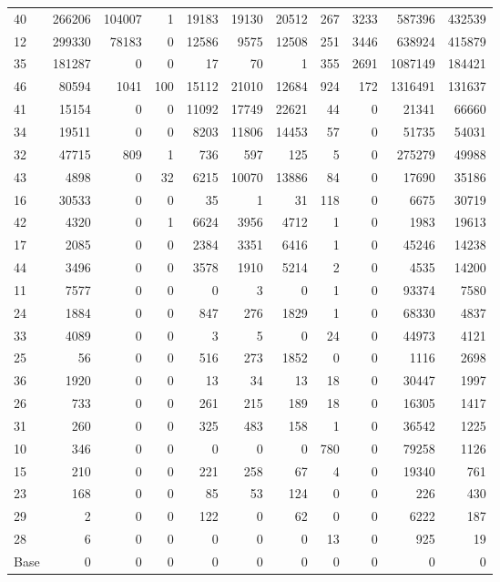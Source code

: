 \begin{table}
{\begin{tabular}[t]{lrrrrrrrrrr}
40 & 266206 & 104007 & 1 & 19183 & 19130 & 20512 & 267 & 3233 & 587396 & 432539\\
12 & 299330 & 78183 & 0 & 12586 & 9575 & 12508 & 251 & 3446 & 638924 & 415879\\
35 & 181287 & 0 & 0 & 17 & 70 & 1 & 355 & 2691 & 1087149 & 184421\\
46 & 80594 & 1041 & 100 & 15112 & 21010 & 12684 & 924 & 172 & 1316491 & 131637\\
41 & 15154 & 0 & 0 & 11092 & 17749 & 22621 & 44 & 0 & 21341 & 66660\\
34 & 19511 & 0 & 0 & 8203 & 11806 & 14453 & 57 & 0 & 51735 & 54031\\
32 & 47715 & 809 & 1 & 736 & 597 & 125 & 5 & 0 & 275279 & 49988\\
43 & 4898 & 0 & 32 & 6215 & 10070 & 13886 & 84 & 0 & 17690 & 35186\\
16 & 30533 & 0 & 0 & 35 & 1 & 31 & 118 & 0 & 6675 & 30719\\
42 & 4320 & 0 & 1 & 6624 & 3956 & 4712 & 1 & 0 & 1983 & 19613\\
17 & 2085 & 0 & 0 & 2384 & 3351 & 6416 & 1 & 0 & 45246 & 14238\\
44 & 3496 & 0 & 0 & 3578 & 1910 & 5214 & 2 & 0 & 4535 & 14200\\
11 & 7577 & 0 & 0 & 0 & 3 & 0 & 1 & 0 & 93374 & 7580\\
24 & 1884 & 0 & 0 & 847 & 276 & 1829 & 1 & 0 & 68330 & 4837\\
33 & 4089 & 0 & 0 & 3 & 5 & 0 & 24 & 0 & 44973 & 4121\\
25 & 56 & 0 & 0 & 516 & 273 & 1852 & 0 & 0 & 1116 & 2698\\
36 & 1920 & 0 & 0 & 13 & 34 & 13 & 18 & 0 & 30447 & 1997\\
26 & 733 & 0 & 0 & 261 & 215 & 189 & 18 & 0 & 16305 & 1417\\
31 & 260 & 0 & 0 & 325 & 483 & 158 & 1 & 0 & 36542 & 1225\\
10 & 346 & 0 & 0 & 0 & 0 & 0 & 780 & 0 & 79258 & 1126\\
15 & 210 & 0 & 0 & 221 & 258 & 67 & 4 & 0 & 19340 & 761\\
23 & 168 & 0 & 0 & 85 & 53 & 124 & 0 & 0 & 226 & 430\\
29 & 2 & 0 & 0 & 122 & 0 & 62 & 0 & 0 & 6222 & 187\\
28 & 6 & 0 & 0 & 0 & 0 & 0 & 13 & 0 & 925 & 19\\
Base & 0 & 0 & 0 & 0 & 0 & 0 & 0 & 0 & 0 & 0\\
\bottomrule
\end{tabular}
}
\end{table}

